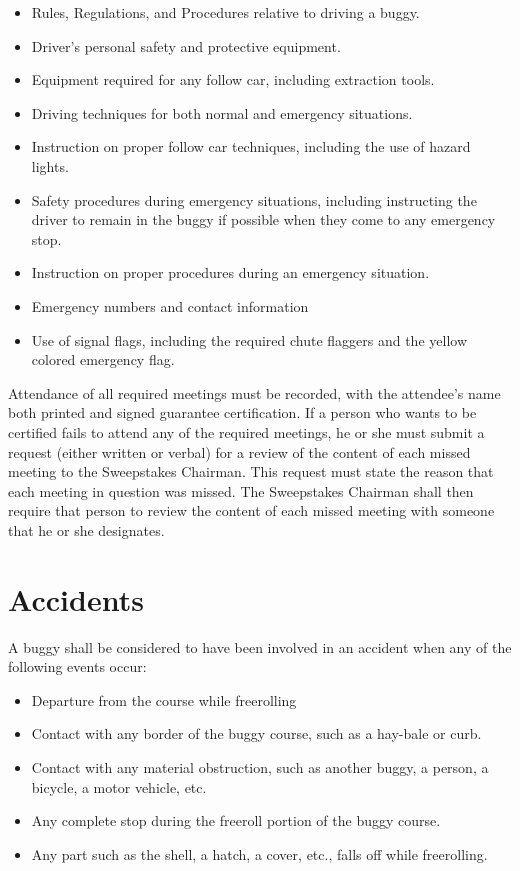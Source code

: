	\begin{itemize}
		\item Rules, Regulations, and Procedures relative to driving a buggy.
		\item Driver's personal safety and protective equipment.
		\item Equipment required for any follow car, including extraction tools.
		\item Driving techniques for both normal and emergency situations.
		\item Instruction on proper follow car techniques, including the use of hazard lights.
		\item Safety procedures during emergency situations, including instructing the driver to remain in the buggy if possible when they come to any emergency stop.
		\item Instruction on proper procedures during an emergency situation.
		\item Emergency numbers and contact information
		\item Use of signal flags, including the required chute flaggers and the yellow colored emergency flag. 
	\end{itemize}

	
	Attendance of all required meetings must be recorded, with the attendee's name 
	both printed and signed guarantee certification. If a person who wants to be 
	certified fails to attend any of the required meetings, he or she must submit 
	a request (either written or verbal) for a review of the content of each 
	missed meeting to the Sweepstakes Chairman. This request must state the reason
	that each meeting in question was missed. The Sweepstakes Chairman shall then 
	require that person to review the content of each missed meeting with someone 
	that he or she designates. 

\section{Accidents}

	\noindent A buggy shall be considered to have been involved in an accident when any of the following events occur:

	\begin{itemize}

		\item Departure from the course while freerolling

		\item Contact with any border of the buggy course, such as a hay-bale or curb.

		\item Contact with any material obstruction, such as another buggy, a person, a bicycle, a motor vehicle, etc.

		\item Any complete stop during the freeroll portion of the buggy course.

		\item Any part such as the shell, a hatch, a cover, etc., falls	off while freerolling.

	\end{itemize}


